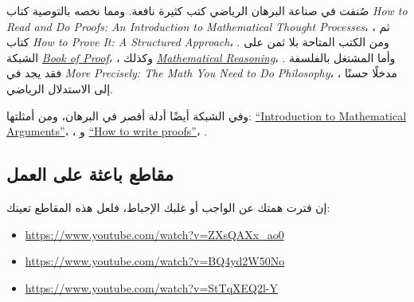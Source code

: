 \documentclass[../../../include/open-logic-section]{subfiles}
\begin{document}


صُنفت في صناعة البرهان الرياضي كتب كثيرة نافعة. ومما نخصه بالتوصية
كتاب \emph{How to Read and Do Proofs: An Introduction to
Mathematical Thought Processes}، \citep{Solow2013}، ثم كتاب
\emph{How to Prove It: A Structured Approach}، \citep{Velleman2019}.
ومن الكتب المتاحة بلا ثمن على الشبكة
\href{http://www.people.vcu.edu/~rhammack/BookOfProof/BookOfProof.pdf}{\emph{Book
of Proof}}، \citep{Hammack2013}، وكذلك
\href{https://scholarworks.gvsu.edu/books/7/}{\emph{Mathematical
Reasoning}}، \citep{Sandstrum2019}. وأما المشتغل بالفلسفة فقد يجد في
\emph{More Precisely: The Math You Need to Do Philosophy}،
\citep{Steinhart2018}، مدخلًا حسنًا إلى الاستدلال الرياضي.

وفي الشبكة أيضًا أدلة أقصر في البرهان، ومن أمثلتها:
\href{https://math.berkeley.edu/~hutching/teach/proofs.pdf}{``Introduction
  to Mathematical Arguments''}، \citep{Hutchings2003}، و
\href{https://eugeniacheng.com/wp-content/uploads/2017/02/cheng-proofguide.pdf}{``How to
  write proofs''}، \citep{Cheng2004}.

\subsection{مقاطع باعثة على العمل}

إن فترت همتك عن الواجب أو غلبك الإحباط، فلعل هذه المقاطع تعينك:

\begin{itemize}
\item \url{https://www.youtube.com/watch?v=ZXsQAXx_ao0}
\item \url{https://www.youtube.com/watch?v=BQ4yd2W50No}
\item \url{https://www.youtube.com/watch?v=StTqXEQ2l-Y}
\end{itemize}
\end{document}
